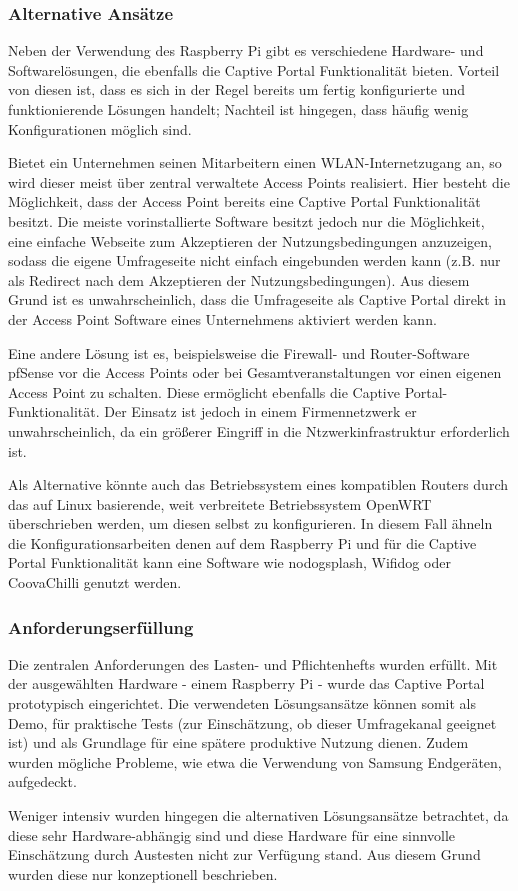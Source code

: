 \subsubsection{Alternative Ansätze}
Neben der Verwendung des Raspberry Pi gibt es verschiedene Hardware- und Softwarelösungen, die ebenfalls die Captive Portal Funktionalität bieten. Vorteil von diesen ist, dass es sich in der Regel bereits um fertig konfigurierte und funktionierende Lösungen handelt; Nachteil ist hingegen, dass häufig wenig Konfigurationen möglich sind.

Bietet ein Unternehmen seinen Mitarbeitern einen WLAN-Internetzugang an, so wird dieser meist über zentral verwaltete Access Points realisiert. Hier besteht die Möglichkeit, dass der Access Point bereits eine Captive Portal Funktionalität besitzt. Die meiste vorinstallierte Software besitzt jedoch nur die Möglichkeit, eine einfache Webseite zum Akzeptieren der Nutzungsbedingungen anzuzeigen, sodass die eigene Umfrageseite nicht einfach eingebunden werden kann (z.B. nur als Redirect nach dem Akzeptieren der Nutzungsbedingungen). Aus diesem Grund ist es unwahrscheinlich, dass die Umfrageseite als Captive Portal direkt in der Access Point Software eines Unternehmens aktiviert werden kann.

Eine andere Lösung ist es, beispielsweise die Firewall- und Router-Software pfSense vor die Access Points oder bei Gesamtveranstaltungen vor einen eigenen Access Point zu schalten. Diese ermöglicht ebenfalls die Captive Portal-Funktionalität. Der Einsatz ist jedoch in einem Firmennetzwerk er unwahrscheinlich, da ein größerer Eingriff in die Ntzwerkinfrastruktur erforderlich ist.

Als Alternative könnte auch das Betriebssystem eines kompatiblen Routers durch das auf Linux basierende, weit verbreitete Betriebssystem OpenWRT überschrieben werden, um diesen selbst zu konfigurieren. In diesem Fall ähneln die Konfigurationsarbeiten denen auf dem Raspberry Pi und für die Captive Portal Funktionalität kann eine Software wie nodogsplash, Wifidog oder CoovaChilli genutzt werden.




\subsubsection{Anforderungserfüllung}
Die zentralen Anforderungen des Lasten- und Pflichtenhefts wurden erfüllt. Mit der ausgewählten Hardware - einem Raspberry Pi - wurde das Captive Portal prototypisch eingerichtet. Die verwendeten Lösungsansätze können somit als Demo, für praktische Tests (zur Einschätzung, ob dieser Umfragekanal geeignet ist) und als Grundlage für eine spätere produktive Nutzung dienen. Zudem wurden mögliche Probleme, wie etwa die Verwendung von Samsung Endgeräten, aufgedeckt.

Weniger intensiv wurden hingegen die alternativen Lösungsansätze betrachtet, da diese sehr Hardware-abhängig sind und diese Hardware für eine sinnvolle Einschätzung durch Austesten nicht zur Verfügung stand. Aus diesem Grund wurden diese nur konzeptionell beschrieben.

